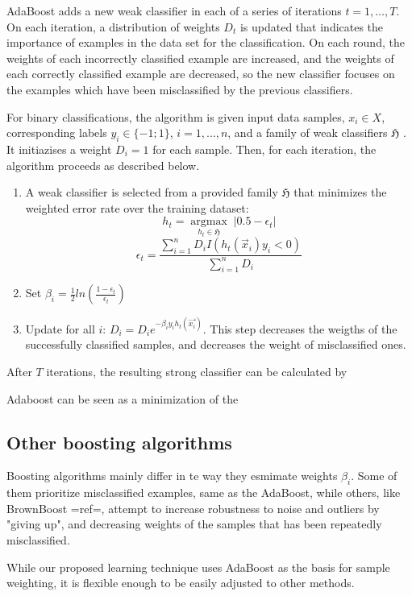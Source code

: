 AdaBoost adds a new weak classifier in each of a series of iterations  $t = 1,\ldots,T$. On each iteration, a distribution of weights $D_{t}$ is updated that indicates the importance of examples in the data set for the classification. On each round, the weights of each incorrectly classified example are increased, and the weights of each correctly classified example are decreased, so the new classifier focuses on the examples which have been misclassified by the previous classifiers.

	For binary classifications, the algorithm is given input data samples, $x_i \in X$,  corresponding labels $y_i\in \{-1;1\}$, $i = 1,\ldots,n$, and a family of weak classifiers $\mathfrak{H}$ .  It initiazises a weight $D_i=1$ for each sample. Then, for each iteration, the algorithm proceeds as described below.
\begin{enumerate}
\item {A weak classifier is selected from a provided family  $\mathfrak{H}$ that minimizes the weighted error rate over the training dataset:
$$
    h_{t} =\underset{h_{t} \in \mathfrak{H}}{\operatorname{argmax}}  \; \left| 0.5 - \epsilon_{t}\right|
$$}
$$
\epsilon_{t}=\frac{\sum_{i=1}^{n}D_i I(h_t(\vec{x}_i)y_i<0)}{\sum_{i=1}^{n}D_i}
$$
\item {Set $\beta_i=\frac{1}{2}ln\left(\frac{1-\epsilon_{t}}{\epsilon_{t}}\right)$}
\item{Update for all $i$: $D_i=D_i e^{-\beta_i y_i h_t(\vec{x_i})}$. This step decreases the weigths of the successfully classified samples, and decreases the weight of misclassified ones. }
\end{enumerate}

After $T$ iterations, the resulting strong classifier can be calculated by 

Adaboost can be seen as a minimization of the
\subsection{Other boosting algorithms}
Boosting algorithms mainly differ in te way they esmimate weights $\beta_i$. Some of them prioritize misclassified examples, same as the AdaBoost, while others, like BrownBoost {{=ref=}}, attempt to increase robustness to noise and outliers by "giving up", and decreasing weights of the samples that has been repeatedly misclassified. 

While our proposed learning technique uses AdaBoost as the basis for sample weighting, it is flexible enough to be easily adjusted to other methods. 

